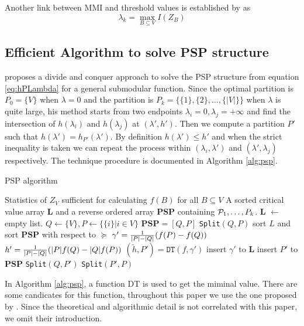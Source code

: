 Another link between MMI and threshold values is established by \citet{agg_ic} as 
\begin{equation}\label{eq:largest_threshold}
\lambda_k = \max_{B\subseteq V} I(Z_B)
\end{equation}
\subsection{Efficient Algorithm to solve PSP structure}
\cite{narayanan} proposes a divide and conquer approach to solve the PSP structure from equation \eqref{eq:hPLambda} for a general submodular function. Since the optimal partition is $P_0 = \{V\}$ when $\lambda=0$ and the partition is $P_k=\{\{1\}, \{2\}, \dots, \{|V|\}\}$ when $\lambda$ is quite large,
his method starts from two endpoints $\lambda_i = 0, \lambda_j = +\infty$ and find the intersection of 
$h(\lambda_i)$ and $h(\lambda_j)$ at $(\lambda', h')$. Then we compute a partition $P'$ such that $h(\lambda') = h_{P'}(\lambda')$. By definition $h(\lambda') \leq h'$ and when the strict inequality is taken we can repeat the process within $(\lambda_i, \lambda')$ and $(\lambda', \lambda_j)$ respectively. The technique procedure is documented in Algorithm \ref{alg:psp}.
\begin{algorithm}
\caption{PSP algorithm}\label{alg:psp}
\begin{algorithmic}[1]
\REQUIRE Statistics of $Z_V$ sufficient for calculating $f(B)$ for all $B \subseteq V$
\ENSURE A sorted critical value array \textbf{L} and a reverse ordered array \textbf{PSP} containing $\P_1,\dots, P_k$.
\STATE \textbf{L}  $\leftarrow$ empty list.
\STATE $Q\leftarrow \{V\}, P \leftarrow \{ \{i \} | i \in V\}$
\STATE $\mathbf{PSP}= [Q, P]$
\STATE \texttt{Split}$(Q,P)$
\STATE sort $L$ and sort $\mathbf{PSP}$ with respect to $\succeq$ 
 \STATE\label{alg:gamma} $\gamma' = {1 \over \abs{P} - \abs{Q}} (f(P)-f(Q))$
 \STATE $h' = {1 \over \abs{P} - \abs{Q}}(\abs{P} f(Q) - \abs{Q} f(P))$
 \STATE $(\tilde{h}, P') = \texttt{DT}(f,\gamma')$ \footnotemark
 	\STATE insert $\gamma'$ to $\mathbf{L}$
 \ELSE
 	\STATE insert $P'$ to $\mathbf{PSP}$
 	\STATE \texttt{Split}$(Q, P')$
 	\STATE \texttt{Split}$(P',P)$
 \ENDIF
\ENDFUNCTION
\end{algorithmic}
\end{algorithm}

In Algorithm \ref{alg:psp}, a function DT is used to get the miminal value. There are some candicates for this function, throughout this paper we use the one proposed by \cite{mac}. Since the theoretical and algorithmic detail is not correlated with this paper, we omit their introduction.


